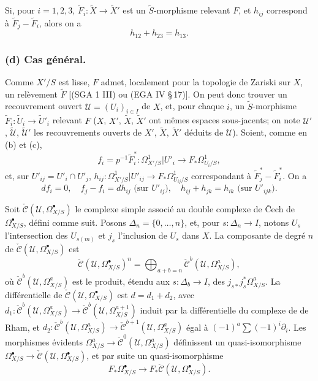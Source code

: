 \documentclass[12pt,a4paper]{article}
\theoremstyle{plain}
\theoremstyle{definition}
\theoremstyle{remark}
\begin{document}
Si, pour $i = 1, 2, 3$, $\tilde{F}_i: \tilde{X} \to \tilde{X}'$ est un $\tilde{S}$-morphisme relevant $F$, et $h_{ij}$ correspond \`a $\tilde{F}_j - \tilde{F}_i$, alors on a
\begin{equation}\label{eq:5}
h_{12} + h_{23} = h_{13}.
\end{equation}

\subsubsection*{(d) Cas g\'en\'eral.}

Comme $X'/S$ est lisse, $F$ admet, localement pour la topologie de Zariski sur $X$, un rel\`evement $\tilde{F}$ [(SGA 1 III) ou (EGA IV \S\,17)]. On peut donc trouver un recouvrement ouvert $\mathscr{U} = (U_i)_{i \in I}$ de $X$, et, pour chaque $i$, un $\tilde{S}$-morphisme $\tilde{F}_i: \tilde{U}_i \to \tilde{U}'_i$ relevant $F$ ($X$, $X'$, $\tilde{X}$, $\tilde{X}'$ ont m\^emes espaces sous-jacents; on note $\mathscr{U}'$, $\tilde{\mathscr{U}}$, $\tilde{\mathscr{U}}'$ les recouvrements ouverts de $X'$, $\tilde{X}$, $\tilde{X}'$ d\'eduits de $\mathscr{U}$). Soient, comme en (b) et (c),
\[
f_i = p^{-1}\tilde{F}_i^*: \Omega^1_{X'/S}|U'_i \to F_* \Omega^1_{U_i/S},
\]
et, sur $U'_{ij} = U'_i \cap U'_j$, $h_{ij}: \Omega^1_{X'/S}|U'_{ij} \to F_* \Omega^1_{U_{ij}/S}$ correspondant \`a $\tilde{F}_j^* - \tilde{F}_i^*$. On a
\begin{equation}\label{eq:6}
df_i = 0, \quad f_j - f_i = dh_{ij} \text{ (sur } U'_{ij}\text{)}, \quad h_{ij} + h_{jk} = h_{ik} \text{ (sur } U'_{ijk}\text{)}.
\end{equation}

Soit $\check{\mathscr{C}}(\mathscr{U}, \Omega^{\bullet}_{X/S})$ le complexe simple associ\'e au double complexe de \v{C}ech de $\Omega^{\bullet}_{X/S}$, d\'efini comme suit. Posons $\Delta_n = \{0, \ldots, n\}$, et, pour $s: \Delta_n \to I$, notons $U_s$ l'intersection des $U_{s(m)}$ et $j_s$ l'inclusion de $U_s$ dans $X$. La composante de degr\'e $n$ de $\check{\mathscr{C}}(\mathscr{U}, \Omega^{\bullet}_{X/S})$ est
\[
\check{\mathscr{C}}(\mathscr{U}, \Omega^{\bullet}_{X/S})^n = \bigoplus_{a+b=n} \check{\mathscr{C}}^b(\mathscr{U}, \Omega^a_{X/S}),
\]
o\`u $\check{\mathscr{C}}^b(\mathscr{U}, \Omega^a_{X/S})$ est le produit, \'etendu aux $s: \Delta_b \to I$, des $j_{s*} j_s^* \Omega^a_{X/S}$. La diff\'erentielle de $\check{\mathscr{C}}(\mathscr{U}, \Omega^{\bullet}_{X/S})$ est $d = d_1 + d_2$, avec $d_1: \check{\mathscr{C}}^b(\mathscr{U}, \Omega^a_{X/S}) \to \check{\mathscr{C}}^b(\mathscr{U}, \Omega^{a+1}_{X/S})$ induit par la diff\'erentielle du complexe de de Rham, et $d_2: \check{\mathscr{C}}^b(\mathscr{U}, \Omega^a_{X/S}) \to \check{\mathscr{C}}^{b+1}(\mathscr{U}, \Omega^a_{X/S})$ \'egal \`a $(-1)^a \sum (-1)^i \partial_i$. Les morphismes \'evidents $\Omega^a_{X/S} \to \check{\mathscr{C}}^0(\mathscr{U}, \Omega^a_{X/S})$ d\'efinissent un quasi-isomorphisme $\Omega^{\bullet}_{X/S} \to \check{\mathscr{C}}(\mathscr{U}, \Omega^{\bullet}_{X/S})$, et par suite un quasi-isomorphisme
\begin{equation}\label{eq:7}
F_* \Omega^{\bullet}_{X/S} \to F_* \check{\mathscr{C}}(\mathscr{U}, \Omega^{\bullet}_{X/S}).
\end{equation}
\end{document}
